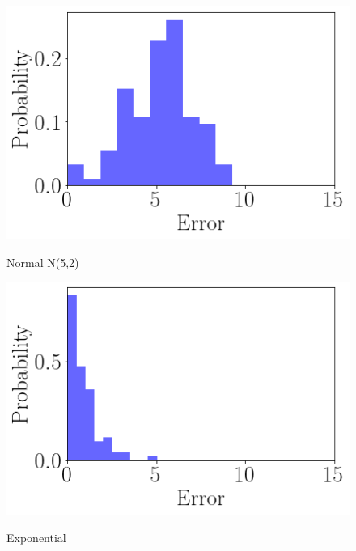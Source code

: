 \begin{figure}[ht]
    \begin{minipage}[b]{0.5\linewidth}
        \centering
        \includegraphics[width=\linewidth]{./img/distributions/normal_hist.png}
        \caption{Normal N(5,2)}
        \vspace{4ex}
    \end{minipage}%
    \begin{minipage}[b]{0.5\linewidth}
        \centering
        \includegraphics[width=\linewidth]{./img/distributions/exponential_hist.png}
        \caption{Exponential}
        \vspace{4ex}
        \label{exponential_hist}
    \end{minipage}
    \begin{minipage}[b]{0.5\linewidth}
        \centering

\end{minipage}
\end{figure}
